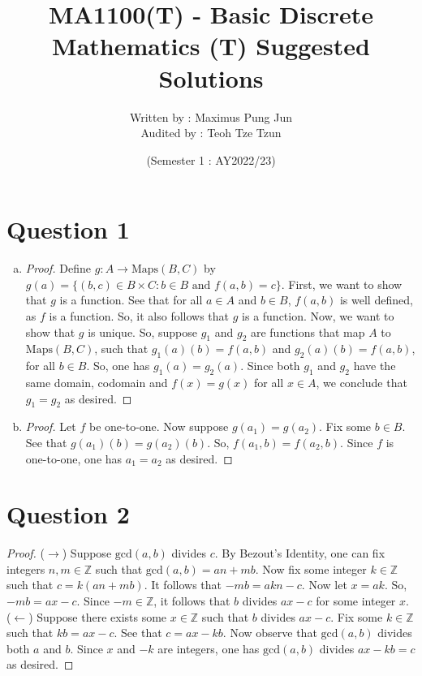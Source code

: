 \documentclass{article}
\title{MA1100(T) - Basic Discrete Mathematics (T) Suggested Solutions}
\date{(Semester 1 : AY2022/23)}
\author{Written by : Maximus Pung Jun\newline \\Audited by : Teoh Tze Tzun }
\begin{document}
\maketitle

\section*{Question 1}
\begin{enumerate}[(a)]
\item
\begin{proof}
Define $g:A\rightarrow{\text{Maps}(B,C)}$ by $g(a)=\{(b,c)\in{B}\times{C}:{b\in{B} \text{ and } f(a,b)=c}\}$. First, we want to show that $g$ is a function. See that for all $a\in{A}$ and $b\in{B}$, $f(a,b)$ is well defined, as $f$ is a function. So, it also follows that $g$ is a function. Now, we want to show that $g$ is unique. So, suppose $g_1$ and $g_2$ are functions that map $A$ to $\text{Maps}(B,C)$, such that $g_1(a)(b)=f(a,b)$ and $g_2(a)(b)=f(a,b)$, for all $b\in{B}$. So, one has $g_1(a)=g_2(a)$. Since both $g_1$ and $g_2$ have the same domain, codomain and $f(x)=g(x)$ for all $x\in{A}$, we conclude that $g_1=g_2$ as desired.
\end{proof}
\item \begin{proof}
    Let $f$ be one-to-one. Now suppose $g(a_1)=g(a_2)$. Fix some $b\in{B}$. See that $g(a_1)(b)=g(a_2)(b)$. So, $f(a_1,b)=f(a_2,b)$. Since $f$ is one-to-one, one has $a_1=a_2$ as desired.
\end{proof}
\end{enumerate}

\section*{Question 2}
\begin{proof}
    ($\rightarrow$) Suppose $\text{gcd}(a,b)$ divides $c$. By Bezout's Identity, one can fix integers $n,m\in{\mathbb{Z}}$ such that $\text{gcd}(a,b)=an+mb$. Now fix some integer $k\in\mathbb{Z}$ such that $c=k(an+mb)$. It follows that $-mb=akn-c$. Now let $x=ak$. So, $-mb=ax-c$. Since $-m\in\mathbb{Z}$, it follows that $b$ divides $ax-c$ for some integer $x$.
    \newline
    \\($\leftarrow$) Suppose there exists some $x\in\mathbb{Z}$ such that $b$ divides $ax-c$. Fix some $k\in\mathbb{Z}$ such that $kb=ax-c$. See that $c=ax-kb$. Now observe that $\text{gcd}(a,b)$ divides both $a$ and $b$. Since $x$ and $-k$ are integers, one has $\text{gcd}(a,b)$ divides $ax-kb=c$ as desired.
\end{proof}
\end{document}
